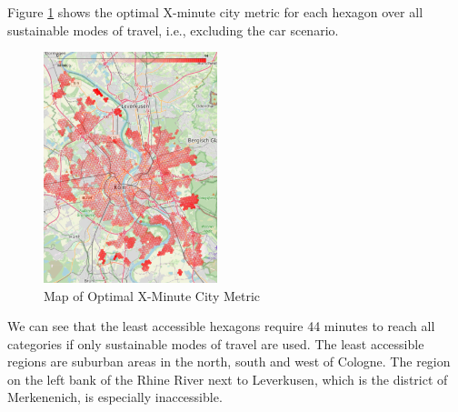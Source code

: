 Figure \ref{fig:optimal_map} shows the optimal X-minute city metric for each hexagon over all sustainable modes of travel, i.e., excluding the car scenario.
\begin{figure}
  \begin{center}
    \includegraphics[width=0.45\textwidth]{Figures/results/minute_city_metric/optimal_map}
  \end{center}
  \caption{Map of Optimal X-Minute City Metric}
  \label{fig:optimal_map}
\end{figure}
We can see that the least accessible hexagons require 44 minutes to reach all categories if only sustainable modes of travel are used.
The least accessible regions are suburban areas in the north, south and west of Cologne. 
The region on the left bank of the Rhine River next to Leverkusen, which is the district of Merkenenich, is especially inaccessible.

